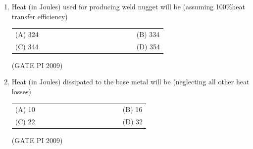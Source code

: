 \documentclass[journal,12pt,onecolumn]{IEEEtran}
\theoremstyle{remark}
\begin{document}
\begin{enumerate}[label=Q.\arabic*), leftmargin=*, resume]

\item Heat (in Joules) used for producing weld nugget will be (assuming 100\%heat transfer efficiency)
\begin{multicols}{2}
\begin{tabular}[t]{p{0.8\linewidth} p{0.9\linewidth}}
(A) 324 & (B) 334 \\
(C) 344 & (D) 354 \\
\end{tabular}
\end{multicols}
\hfill (GATE PI 2009)
\item Heat (in Joules) dissipated to the base metal will be (neglecting all other heat losses)
\begin{multicols}{2}
\begin{tabular}[t]{p{0.8\linewidth} p{0.9\linewidth}}
(A) 10 & (B) 16 \\
(C) 22 & (D) 32 \\
\end{tabular}
\end{multicols}
\hfill (GATE PI 2009)

\end{enumerate}
\end{document}
